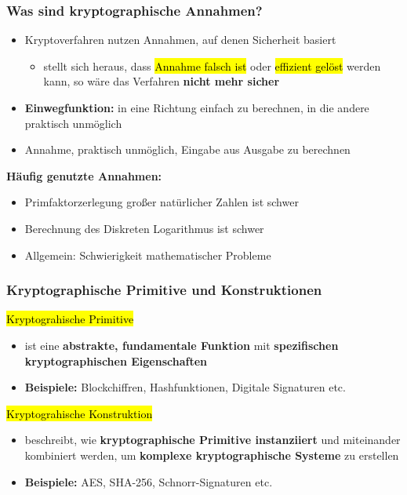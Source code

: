 \documentclass[a4paper, 10pt]{article}
\begin{document}
\subsubsection{Was sind kryptographische Annahmen?}
\begin{itemize}
    \item Kryptoverfahren nutzen Annahmen, auf denen Sicherheit basiert
    \begin{itemize}
        \item stellt sich heraus, dass \hl{Annahme falsch ist} oder \hl{effizient gelöst} werden kann, so wäre das Verfahren \textbf{nicht mehr sicher}
    \end{itemize}
    \item \textbf{Einwegfunktion:} in eine Richtung einfach zu berechnen, in die andere praktisch unmöglich
    \item Annahme, praktisch unmöglich, Eingabe aus Ausgabe zu berechnen
\end{itemize}

\noindent\textbf{Häufig genutzte Annahmen:}
\begin{itemize}
    \item Primfaktorzerlegung großer natürlicher Zahlen ist schwer
    \item Berechnung des Diskreten Logarithmus ist schwer
    \item Allgemein: Schwierigkeit mathematischer Probleme
\end{itemize}

\subsubsection{Kryptographische Primitive und Konstruktionen}
\hl{Kryptograhische Primitive}
\begin{itemize}
    \item ist eine \textbf{abstrakte, fundamentale Funktion} mit \textbf{spezifischen kryptographischen Eigenschaften}
    \item \textbf{Beispiele:} Blockchiffren, Hashfunktionen, Digitale Signaturen etc.
\end{itemize}

\noindent\hl{Kryptograhische Konstruktion}
\begin{itemize}
    \item beschreibt, wie \textbf{kryptographische Primitive instanziiert} und miteinander kombiniert werden, um \textbf{komplexe kryptographische Systeme} zu erstellen
    \item \textbf{Beispiele:} AES, SHA-256, Schnorr-Signaturen etc.
\end{itemize}
\end{document}
